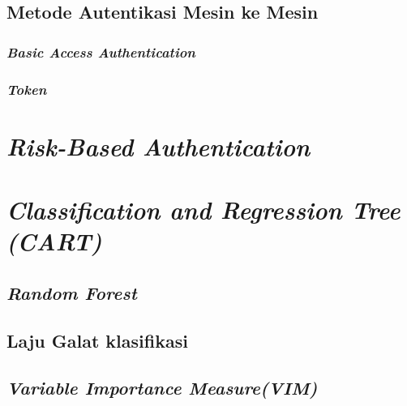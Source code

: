 \documentclass[ugmtesis]{ugmtesis}
\begin{document}
		\subsection{Metode Autentikasi Mesin ke Mesin}
		\label{metode autentikasi mesin ke mesin}
		

			\subsubsection{\textit{Basic Access Authentication}}
			\label{basic access authentication}
			

			\subsubsection{\textit{Token}}
			\label{token}
			

	\section{\textit{Risk-Based Authentication}}
	\label{risk-based authentication}

	\section{\textit{Classification and Regression Tree (CART)}}
	\label{classification and regression tree}

		\subsection{\textit{Random Forest}}
		\label{random forest}


		\subsection{Laju Galat klasifikasi}
		\label{laju galat klasifikasi}

		\subsection{\textit{Variable Importance Measure(VIM)}}
		\label{variable importance measure}


	

\end{document}

